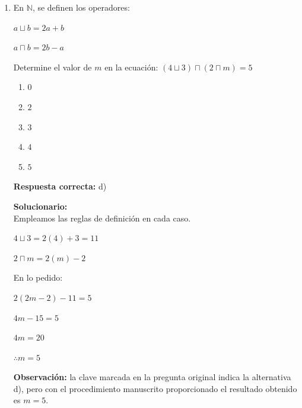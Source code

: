 \begin{enumerate}
	\vspace{2mm}
	\textbf{Solucionario:}\\
	
	Haciendo diferencia por cada dos términos:
	
	$15-12=3$
	
	$21-15=6$
	
	$33-21=12$
	
	Las diferencias se van duplicando.
	
	Entonces:
	
	$X-33=24$
	
	$X=24+33$
	
	$X=57$
	
	Luego:
	
	$105-57=48$
	
	$\therefore X=57$
	
	
	\vspace{6mm}
	
	\item En $\mathbb{N}$, se definen los operadores:
	
	$ a \sqcup b = 2a+b $
	
	$ a \sqcap b = 2b-a $
	
	Determine el valor de $m$ en la ecuación:
	$ (4 \sqcup 3)\sqcap(2 \sqcap m)=5 $
	\begin{enumerate}[label=\alph*)]
		\item $0$
		\item $2$
		\item $3$
		\item $4$
		\item $5$
	\end{enumerate}
	\textbf{Respuesta correcta:} d)
	
	\vspace{2mm}
	\textbf{Solucionario:}\\
	
	Empleamos las reglas de definición en cada caso.
	
	$4\sqcup3=2(4)+3=11$
	
	$2\sqcap m=2(m)-2$
	
	En lo pedido:
	
	$2(2m-2)-11=5$
	
	$4m-15=5$
	
	$4m=20$
	
	$\therefore m=5$
	
	
	\vspace{1mm}
	\textbf{Observación:} la clave marcada en la pregunta original indica la alternativa d), pero con el procedimiento manuscrito proporcionado el resultado obtenido es $m=5$.
	

\end{enumerate}
